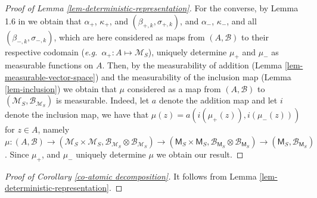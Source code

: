 \documentclass{article}
\theoremstyle{plain}
\theoremstyle{remark}
\begin{document}
\begin{proof}[Proof of Lemma \ref{lem-deterministic-representation}]
	For the converse, by Lemma 1.6 in \cite{Kallenberg2} we obtain that $\alpha_+$, $\kappa_+$, and $(\beta_{+,k},\sigma_{+,k})$, and $\alpha_-$, $\kappa_-$, and all $(\beta_{-,k},\sigma_{-,k})$, which are here considered as maps from $(A,\mathcal{B})$ to their respective codomain (\textit{e.g.}~$\alpha_+:A\mapsto\mathcal{M}_S$), uniquely determine $\mu_+$ and $\mu_-$ as measurable functions on $A$. Then, by the measurability of addition (Lemma \ref{lem-measurable-vector-space}) and the measurability of the inclusion map (Lemma \ref{lem-inclusion}) we obtain that $\mu$ considered as a map from $(A,\mathcal{B})$ to $(\mathcal{M}_S,\mathcal{B}_{\mathcal{M}_S})$ is measurable. Indeed, let $a$ denote the addition map and let $i$ denote the inclusion map, we have that $\mu(z)=a(i(\mu_+(z)),i(\mu_-(z)))$ for $z\in A$, namely $\mu:(A,\mathcal{B})\to(\mathcal{M}_S\times\mathcal{M}_S,\mathcal{B}_{\mathcal{M}_S}\otimes \mathcal{B}_{\mathcal{M}_S})\to(\mathsf{M}_S\times\mathsf{M}_S,\mathcal{B}_{\mathsf{M}_S}\otimes \mathcal{B}_{\mathsf{M}_S})\to(\mathsf{M}_S,\mathcal{B}_{\mathsf{M}_S})$. Since $\mu_+$, and $\mu_-$ uniquely determine $\mu$ we obtain our result.
\end{proof}


\begin{proof}[Proof of Corollary \ref{co-atomic decomposition}]
	It follows from Lemma \ref{lem-deterministic-representation}.
\end{proof}
\end{document}
